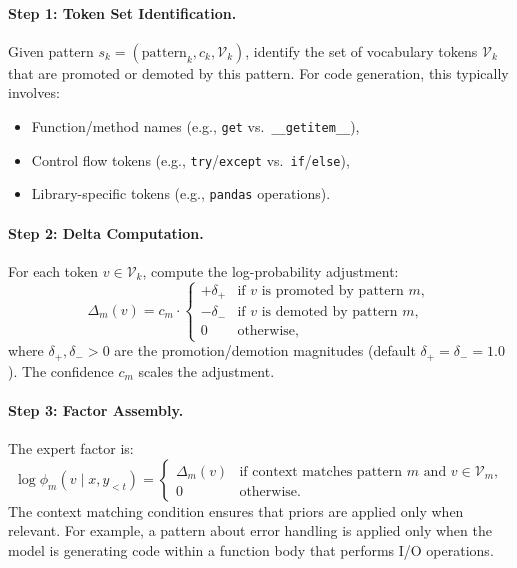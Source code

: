 \paragraph{Step 1: Token Set Identification.}
Given pattern $s_k = (\text{pattern}_k, c_k, \mathcal{V}_k)$, identify the set
of vocabulary tokens $\mathcal{V}_k$ that are promoted or demoted by this
pattern. For code generation, this typically involves:
\begin{itemize}[leftmargin=1.5em]
    \item Function/method names (e.g., \texttt{get} vs.\ \texttt{\_\_getitem\_\_}),
    \item Control flow tokens (e.g., \texttt{try}/\texttt{except} vs.\ \texttt{if}/\texttt{else}),
    \item Library-specific tokens (e.g., \texttt{pandas} operations).
\end{itemize}

\paragraph{Step 2: Delta Computation.}
For each token $v \in \mathcal{V}_k$, compute the log-probability adjustment:
\begin{equation}
    \Delta_m(v) = c_m \cdot \begin{cases}
        +\delta_+ & \text{if } v \text{ is promoted by pattern } m, \\
        -\delta_- & \text{if } v \text{ is demoted by pattern } m, \\
        0 & \text{otherwise},
    \end{cases}
\end{equation}
where $\delta_+, \delta_- > 0$ are the promotion/demotion magnitudes (default
$\delta_+ = \delta_- = 1.0$). The confidence $c_m$ scales the adjustment.

\paragraph{Step 3: Factor Assembly.}
The expert factor is:
\begin{equation}
    \log \phi_m(v \mid x, y_{<t}) = \begin{cases}
        \Delta_m(v) & \text{if context matches pattern } m \text{ and } v \in \mathcal{V}_m, \\
        0 & \text{otherwise}.
    \end{cases}
\end{equation}
The context matching condition ensures that priors are applied only when
relevant. For example, a pattern about error handling is applied only when the
model is generating code within a function body that performs I/O operations.

